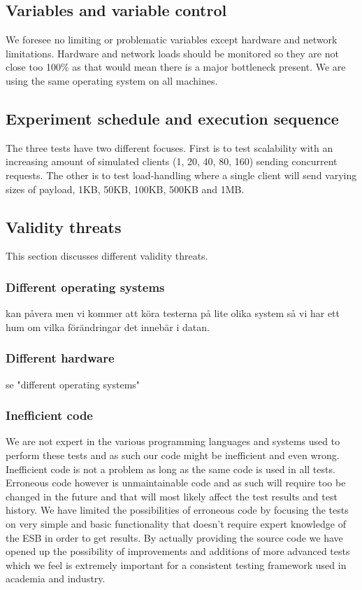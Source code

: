 \subsection{Variables and variable control}
We foresee no limiting or problematic variables except hardware and network limitations.
Hardware and network loads should be monitored so they are not close too 100\% as that would mean there is a major bottleneck present. 
We are using the same operating system on all machines. 
\subsection{Experiment schedule and execution sequence}
The three tests have two different focuses. First is to test scalability with an increasing amount of simulated clients (1, 20, 40, 80, 160) sending concurrent requests. 
The other is to test load-handling where a single client will send varying sizes of payload, 1KB, 50KB, 100KB, 500KB and 1MB.
\subsection{Validity threats}
This section discusses different validity threats.
\subsubsection{Different operating systems}
kan påvera men vi kommer att köra testerna på lite olika system så vi har ett hum om vilka förändringar det innebär i datan.
\subsubsection{Different hardware}
se "different operating systems"
\subsubsection{Inefficient code}
We are not expert in the various programming languages and systems used to perform these tests and as such our code might be inefficient and even wrong. Inefficient code is not a problem as long as the same code is used in all tests. Erroneous code however is unmaintainable code and as such will require too be changed in the future and that will most likely affect the test results and test history. 
We have limited the possibilities of erroneous code by focusing the tests on very simple and basic functionality that doesn't require expert knowledge of the ESB in order to get results.
By actually providing the source code we have opened up the possibility of improvements and additions of more advanced tests which we feel is extremely important for a consistent testing framework used in academia and industry.